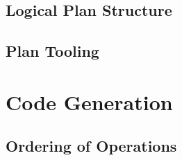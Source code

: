 

\subsection{Logical Plan Structure}


\subsection{Plan Tooling}

\section{Code Generation}

\subsection{Ordering of Operations}

